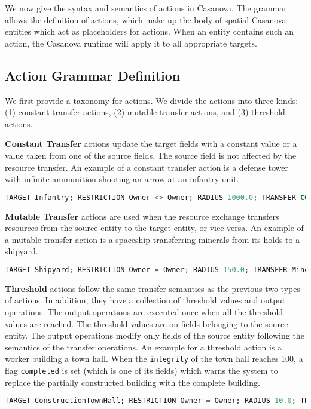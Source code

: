 We now give the syntax and semantics of actions in Casanova. The
grammar allows the definition of actions, which make up the body of
spatial Casanova entities which act as placeholders for
actions. When an entity contains such an action, the Casanova
runtime will apply it to all appropriate targets.

\subsection{Action Grammar Definition}

We first provide a taxonomy for actions. We divide the actions into three
kinds: (1) constant transfer actions, (2) mutable transfer actions, and
(3) threshold actions.

\textbf{Constant Transfer} actions update the target fields with a constant
value or a value taken from one of the source fields. The source field
is not affected by the resource transfer. An example of a constant transfer
action is a defense tower with infinite ammunition shooting an arrow at an infantry unit.

\begin{lstlisting}[language=sql]
TARGET Infantry; RESTRICTION Owner <> Owner; RADIUS 1000.0; TRANSFER CONSTANT Life - ArrowDamage;
\end{lstlisting}

\textbf{Mutable Transfer} actions are used when the resource exchange transfers resources from the source entity
to the target entity, or vice versa. An example of a mutable transfer action is a spaceship
transferring minerals from its holds to a shipyard.

\begin{lstlisting}[language=sql]
TARGET Shipyard; RESTRICTION Owner = Owner; RADIUS 150.0; TRANSFER MineralStash + Minerals;
\end{lstlisting}

\textbf{Threshold} actions follow the same transfer semantics as the previous
two types of actions. In addition, they have a collection of threshold
values and output operations. The output operations are executed once
when all the threshold values are reached. The threshold values are on
fields belonging to the source entity. The output operations modify
only fields of the source entity following the semantics of the
transfer operations. An example for a threshold action is a worker building a town hall. When
the \texttt{integrity} of the town hall reaches 100, a flag
\texttt{completed} is set (which is one of its fields) which warns the
system to replace the partially constructed building with the complete
building.
\begin{lstlisting}[language=sql]
TARGET ConstructionTownHall; RESTRICTION Owner = Owner; RADIUS 10.0; TRANSFER CONSTANT Integrity + 1.0; THRESHOLD Integrity = 100.0; OUTPUT Completed := true
\end{lstlisting}

